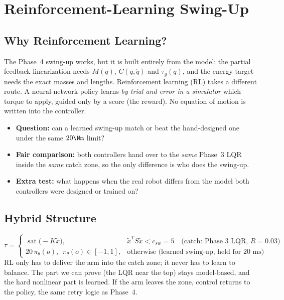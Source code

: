 \section{Reinforcement-Learning Swing-Up}
\subsection{Why Reinforcement Learning?}
The Phase~4 swing-up works, but it is built entirely from the model: the partial feedback linearization needs $M(q)$, $C(q,\dot q)$ and $\tau_g(q)$, and the energy target needs the exact masses and lengths. Reinforcement learning (RL) takes a different route. A neural-network policy learns \emph{by trial and error in a simulator} which torque to apply, guided only by a score (the reward). No equation of motion is written into the controller.
\begin{itemize}
\item \textbf{Question:} can a learned swing-up match or beat the hand-designed one under the same $20\Nm$ limit?
\item \textbf{Fair comparison:} both controllers hand over to the \emph{same} Phase~3 LQR inside the \emph{same} catch zone, so the only difference is who does the swing-up.
\item \textbf{Extra test:} what happens when the real robot differs from the model both controllers were designed or trained on?
\end{itemize}

\subsection{Hybrid Structure}
\begin{equation}
\tau=\begin{cases}\operatorname{sat}\big(-K\tilde x\big), & \tilde x^TS\tilde x<c_{sw}=5\quad\text{(catch: Phase 3 LQR, } R=0.03\text{)}\\[2pt] 20\,\pi_\theta(o),\ \ \pi_\theta(o)\in[-1,1], & \text{otherwise (learned swing-up, held for 20 ms)}\end{cases}
\end{equation}
RL only has to deliver the arm into the catch zone; it never has to learn to balance. The part we can prove (the LQR near the top) stays model-based, and the hard nonlinear part is learned. If the arm leaves the zone, control returns to the policy, the same retry logic as Phase~4.

